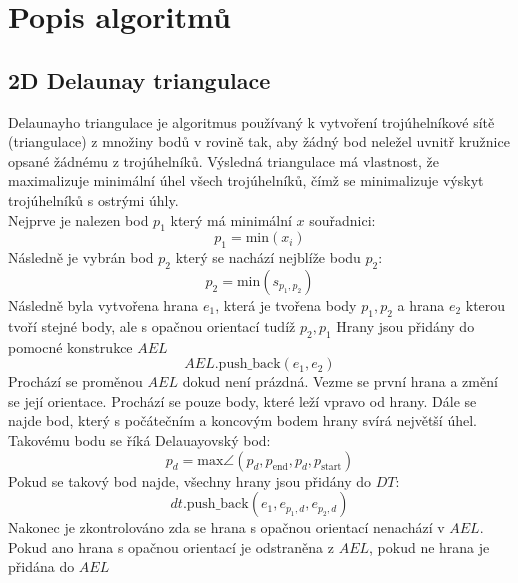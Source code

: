 \section{Popis algoritmů}

\subsection{2D Delaunay triangulace}
Delaunayho triangulace je algoritmus používaný k vytvoření trojúhelníkové sítě (triangulace) z množiny bodů v rovině tak, aby žádný bod neležel uvnitř kružnice opsané žádnému z trojúhelníků. Výsledná triangulace má vlastnost, že maximalizuje minimální úhel všech trojúhelníků, čímž se minimalizuje výskyt trojúhelníků s ostrými úhly.\\

\hspace{-1.15cm}
Nejprve je nalezen bod $p_1$ který má minimální $x$ souřadnici: 
\begin{equation}
    p_1 = \text{min}(x_i)
\end{equation}
Následně je vybrán bod $p_2$ který se nachází nejblíže bodu $p_2$:
\begin{equation}
    p_2 = \text{min}(s_{p_1,p_2})
\end{equation}
Následně byla vytvořena hrana $e_1$, která je tvořena body $p_1,p_2$ a hrana $e_2$ kterou tvoří stejné body, ale s opačnou orientací tudíž $p_2,p_1$
Hrany jsou přidány do pomocné konstrukce $AEL$
\begin{equation}
    AEL.\text{push\_back}(e_1,e_2)
\end{equation}
Prochází se proměnou $AEL$ dokud není prázdná. Vezme se první hrana a změní se její orientace. Prochází se pouze body, které leží vpravo od hrany. Dále se najde bod, který s počátečním a koncovým bodem hrany svírá největší úhel. Takovému bodu se říká Delauayovský bod:
\begin{equation}
    p_{d} = \text{max} \angle( p_{d},p_{\text{end}},p_d,p_{\text{start}})
\end{equation}
Pokud se takový bod najde, všechny hrany jsou přidány do $DT$:
\begin{equation}
    dt.\text{push\_back}(e_{1},e_{p_1,d},e_{p_2,d})
\end{equation}
Nakonec je zkontrolováno zda se hrana s opačnou orientací nenachází v $AEL$. Pokud ano hrana s opačnou orientací je odstraněna z $AEL$, pokud ne hrana je přidána do $AEL$ 



